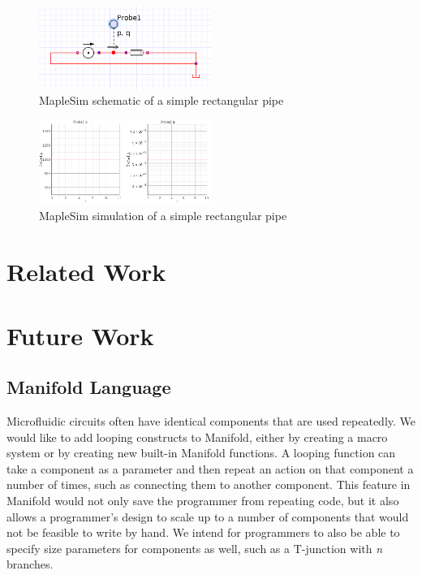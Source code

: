\begin{figure}[ht]
  \caption{MapleSim schematic of a simple rectangular pipe}
  \centering
    \includegraphics[width=0.5\textwidth]{img/simple-pipe.png}
\end{figure}
\begin{figure}[ht]
  \caption{MapleSim simulation of a simple rectangular pipe}
  \centering
    \includegraphics[width=0.5\textwidth]{img/simple-pipe-simulation.png}
\end{figure}

\section{Related Work}



\section{Future Work}

\subsection{Manifold Language}

Microfluidic circuits often have identical components that are used repeatedly.
We would like to add looping constructs to Manifold, either by creating a
macro system or by creating new built-in Manifold functions. A looping function
can take a component as a parameter and then repeat an action on that
component a number of times, such as connecting them to another component.
This feature in Manifold would not only save the programmer from repeating
code, but it also allows a programmer's design to scale up to a number of
components that would not be feasible to write by hand. We intend for
programmers to also be able to specify size parameters for components as
well, such as a T-junction with \emph{n} branches.

